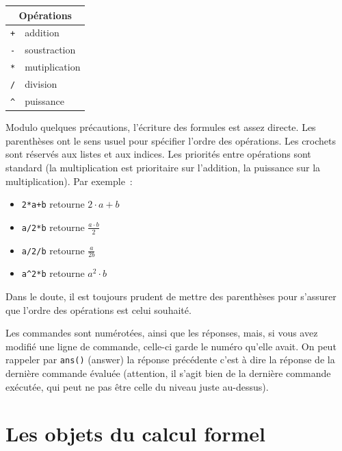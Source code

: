 \documentclass{article}
\begin{document}
\begin{giacjshere}
\begin{center}
\begin{tabular}{|ll|}
\hline
\multicolumn{2}{|c|}{\bf Op\'erations}\\
\hline\hline
\verb|+|& addition\\
\verb|-|& soustraction \\
\verb|*|& mutiplication  \\
\verb|/|& division\\
\verb|^|& puissance  \\
\hline
\end{tabular}
\end{center}

Modulo quelques pr\'ecautions, l'\'ecriture des formules est assez
directe. Les parenth\`eses ont le sens 
usuel pour sp\'ecifier l'ordre des op\'erations. Les crochets 
sont r\'eserv\'es aux listes et aux indices.
Les priorit\'es entre op\'erations sont standard 
(la multiplication est prioritaire sur l'addition, la puissance sur
la multiplication). Par exemple~:
%
\begin{itemize}
\item
\verb|2*a+b| retourne $2\cdot a+b$
\item
\verb|a/2*b| retourne $\displaystyle \frac{a\cdot b}{2}$\\
\item
\verb|a/2/b| retourne $\displaystyle \frac{a}{2b}$
\item
\verb|a^2*b| retourne $a^2\cdot b$
\end{itemize}
Dans le doute, il est toujours prudent de mettre des parenth\`eses 
pour s'assurer que l'ordre des op\'erations est celui souhait\'e.

Les commandes sont num\'erot\'ees, ainsi que les r\'eponses,
mais, si vous avez modifi\'e une ligne de commande, celle-ci
garde le num\'ero qu'elle avait. On peut rappeler par \verb|ans()| (answer) la 
r\'eponse pr\'ec\'edente c'est \`a dire la r\'eponse de la derni\`ere commande
\'evalu\'ee (attention, il s'agit bien de la derni\`ere commande
ex\'ecut\'ee, qui peut ne pas \^etre celle du niveau juste au-dessus).
%
\section{Les objets du calcul formel}
%

\end{giacjshere}
\end{document}
